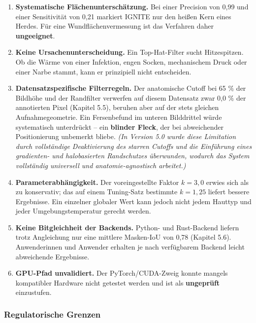 \documentclass[
  11pt,
]{article}
\providecommand{\tightlist}{%
  \setlength{\itemsep}{0pt}\setlength{\parskip}{0pt}}
\begin{document}
\begin{enumerate}
\def\labelenumi{\arabic{enumi}.}
\setcounter{enumi}{8}
\tightlist
\item
  \textbf{Systematische Flächenunterschätzung.} Bei einer Precision von
  0,99 und einer Sensitivität von 0,21 markiert IGNITE nur den heißen
  Kern eines Herdes. Für eine Wundflächenvermessung ist das Verfahren
  daher \textbf{ungeeignet}.
\item
  \textbf{Keine Ursachenunterscheidung.} Ein Top-Hat-Filter sucht
  Hitzespitzen. Ob die Wärme von einer Infektion, engen Socken,
  mechanischem Druck oder einer Narbe stammt, kann er prinzipiell nicht
  entscheiden.
\item
  \textbf{Datensatzspezifische Filterregeln.} Der anatomische Cutoff bei
  65 \% der Bildhöhe und der Randfilter verwerfen auf diesem Datensatz
  zwar 0,0 \% der annotierten Pixel (Kapitel 5.5), beruhen aber auf der
  stets gleichen Aufnahmegeometrie. Ein Fersenbefund im unteren
  Bilddrittel würde systematisch unterdrückt -- ein \textbf{blinder
  Fleck}, der bei abweichender Positionierung unbemerkt bliebe.
  \emph{(In Version 5.0 wurde diese Limitation durch vollständige
  Deaktivierung des starren Cutoffs und die Einführung eines gradienten-
  und halobasierten Randschutzes überwunden, wodurch das System
  vollständig universell und anatomie-agnostisch arbeitet.)}
\item
  \textbf{Parameterabhängigkeit.} Der voreingestellte Faktor
  \(k = 3{,}0\) erwies sich als zu konservativ; das auf einem
  Tuning-Satz bestimmte \(k = 1{,}25\) liefert bessere Ergebnisse. Ein
  einzelner globaler Wert kann jedoch nicht jedem Hauttyp und jeder
  Umgebungstemperatur gerecht werden.
\item
  \textbf{Keine Bitgleichheit der Backends.} Python- und Rust-Backend
  liefern trotz Angleichung nur eine mittlere Masken-IoU von 0,78
  (Kapitel 5.6). Anwenderinnen und Anwender erhalten je nach verfügbarem
  Backend leicht abweichende Ergebnisse.
\item
  \textbf{GPU-Pfad unvalidiert.} Der PyTorch/CUDA-Zweig konnte mangels
  kompatibler Hardware nicht getestet werden und ist als
  \textbf{ungeprüft} einzustufen.
\end{enumerate}

\subsubsection{Regulatorische Grenzen}\label{regulatorische-grenzen}
\end{document}
